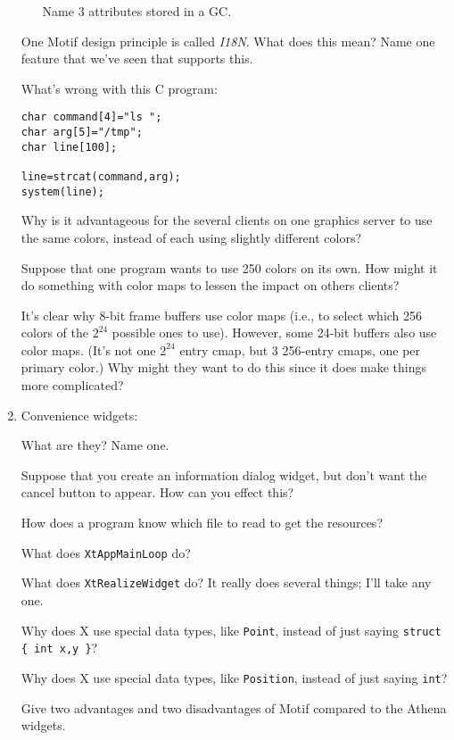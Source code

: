 \documentclass[twoside]{article}
\begin{document}
\begin{enumerate}
\begin{enumerate}
 Name 3 attributes stored in a GC.
\end{enumerate}


 One Motif design principle is called
\emph{I18N}. What does this mean?  Name one feature that we've
seen that supports this. 

 What's wrong with this C program:
\begin{verbatim}
char command[4]="ls ";
char arg[5]="/tmp";
char line[100];

line=strcat(command,arg);
system(line);
\end{verbatim}


Why is it advantageous for the several clients on one graphics
server to use the same colors, instead of each using slightly
different colors?

Suppose that one program wants to use 250 colors on its own.  How
might it do something with color maps to lessen the impact on
others clients?


  It's clear why 8-bit frame buffers use color maps (i.e.,
to select which 256 colors of the $2^{24}$ possible ones to use).
However, some 24-bit buffers also use color maps.  (It's not one
$2^{24}$ entry cmap, but 3 256-entry cmaps, one per primary
color.)  Why might they want to do this since it does make things
more complicated?


\item Convenience widgets:
\begin{enumerate}
 What are they?
 Name one.
\end{enumerate}


 Suppose that you create an information dialog widget, but
don't want the cancel button to appear.  How can you effect this?


 How does a program know which file to read to get the
resources?

 What does \verb+XtAppMainLoop+ do?

 What does \verb+XtRealizeWidget+ do?  It really does
several things; I'll take any one.


Why does X use special data types, like \verb+Point+, instead of just
saying \verb+struct { int x,y }+?


Why does X use special data types, like \verb+Position+, instead of just
saying \verb+int+?


 Give two advantages and two disadvantages of Motif compared to the
Athena widgets.



\end{enumerate}
\end{document}
